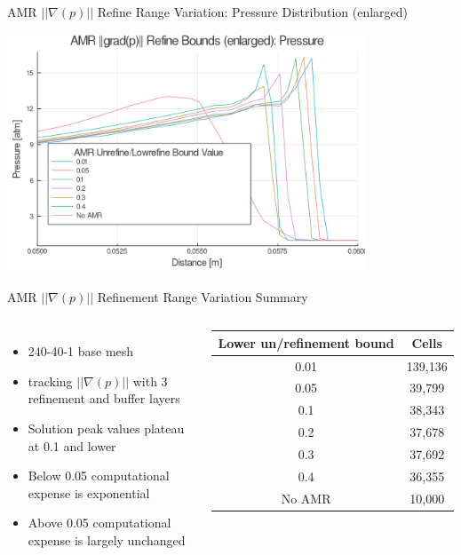 \begin{frame}{AMR $|| \nabla (p)||$ Refine Range Variation: Pressure Distribution (enlarged)}
\begin{center}
\includegraphics[width=0.8\textwidth]{../figs/amrfigs/amr_refinebounds/pe.png}
\end{center}
\end{frame}

\begin{frame}{AMR $|| \nabla (p)||$ Refinement Range Variation Summary}
\begin{columns}
\begin{itemize}
    \item 240-40-1 base mesh 
    \item tracking $|| \nabla (p)||$ with 3 refinement and buffer layers
    \item Solution peak values plateau at 0.1 and lower
    \item Below 0.05 computational expense is exponential 
    \item Above 0.05 computational expense is largely unchanged
\end{itemize}

\begin{table}[h]
\centering
\begin{tabular}{cc}
Lower un/refinement bound & Cells \\ \hline
0.01 & 139,136 \\
0.05 & 39,799 \\
0.1 & 38,343 \\ 
0.2 & 37,678 \\
0.3 & 37,692 \\ 
0.4 & 36,355 \\
No AMR & 10,000 \\
\end{tabular}
\end{table}
\end{columns}
\end{frame}

